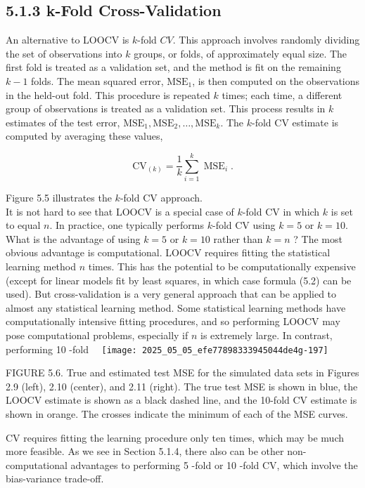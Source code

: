 \documentclass[10pt]{article}
\begin{document}
\subsection*{5.1.3 k-Fold Cross-Validation}
An alternative to LOOCV is $k$-fold $C V$. This approach involves randomly dividing the set of observations into $k$ groups, or folds, of approximately equal size. The first fold is treated as a validation set, and the method is fit on the remaining $k-1$ folds. The mean squared error, $\mathrm{MSE}_{1}$, is then computed on the observations in the held-out fold. This procedure is repeated $k$ times; each time, a different group of observations is treated as a validation set. This process results in $k$ estimates of the test error, $\mathrm{MSE}_{1}, \mathrm{MSE}_{2}, \ldots, \mathrm{MSE}_{k}$. The $k$-fold CV estimate is computed by averaging these values,


\begin{equation*}
\mathrm{CV}_{(k)}=\frac{1}{k} \sum_{i=1}^{k} \operatorname{MSE}_{i} . \tag{5.3}
\end{equation*}


Figure 5.5 illustrates the $k$-fold CV approach.\\
It is not hard to see that LOOCV is a special case of $k$-fold CV in which $k$ is set to equal $n$. In practice, one typically performs $k$-fold CV using $k=5$ or $k=10$. What is the advantage of using $k=5$ or $k=10$ rather than $k=n$ ? The most obvious advantage is computational. LOOCV requires fitting the statistical learning method $n$ times. This has the potential to be computationally expensive (except for linear models fit by least squares, in which case formula (5.2) can be used). But cross-validation is a very general approach that can be applied to almost any statistical learning method. Some statistical learning methods have computationally intensive fitting procedures, and so performing LOOCV may pose computational problems, especially if $n$ is extremely large. In contrast, performing 10 -fold\
\
\texttt{[image: 2025\_05\_05\_efe77898333945044de4g-197]}

FIGURE 5.6. True and estimated test MSE for the simulated data sets in Figures 2.9 (left), 2.10 (center), and 2.11 (right). The true test MSE is shown in blue, the LOOCV estimate is shown as a black dashed line, and the 10-fold CV estimate is shown in orange. The crosses indicate the minimum of each of the MSE curves.

CV requires fitting the learning procedure only ten times, which may be much more feasible. As we see in Section 5.1.4, there also can be other non-computational advantages to performing 5 -fold or 10 -fold CV, which involve the bias-variance trade-off.
\end{document}
